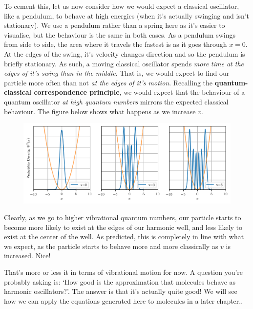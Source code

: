 \documentclass{memoir}[11pt,oneside,a4paper,openany]
\begin{document}
To cement this, let us now consider how we would expect a classical oscillator, like a pendulum, to behave at high energies (when it's actually swinging and isn't stationary). We use a pendulum rather than a spring here as it's easier to visualise, but the behaviour is the same in both cases. As a pendulum swings from side to side, the area where it travels the fastest is as it goes through $x=0$. At the edges of the swing, it's velocity changes direction and so the pendulum is briefly stationary. As such, a moving classical oscillator spends \emph{more time at the edges of it's swing than in the middle}. That is, we would expect to find our particle more often than not \emph{at the edges of it's motion}. Recalling the \textbf{quantum-classical correspondence principle}, we would expect that the behaviour of a quantum oscillator \emph{at high quantum numbers} mirrors the expected classical behaviour. The figure below shows what happens as we increase $v$. 
\begin{figure}[h]
	\centering
	\includegraphics[width=\textwidth]{harmonic_oscillator_probabilities}
\end{figure}
Clearly, as we go to higher vibrational quantum numbers, our particle starts to become more likely to exist at the edges of our harmonic well, and less likely to exist at the center of the well. As predicted, this is completely in line with what we expect, as the particle starts to behave more and more classically as $v$ is increased. Nice!

That's more or less it in terms of vibrational motion for now. A question you're probably asking is: `How good is the approximation that molecules behave as harmonic oscillators?'. The answer is that it's actually quite good! We will see how we can apply the equations generated here to molecules in a later chapter.. 
\end{document}
